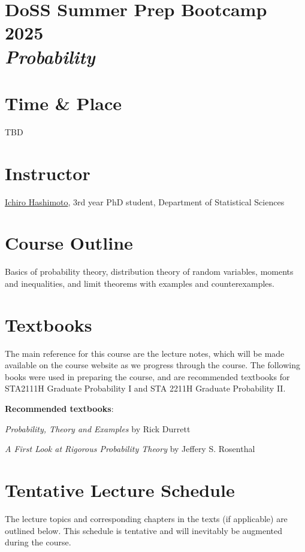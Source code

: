 \documentclass[12pt]{article}
\date{ }
\begin{document}
\section*{DoSS Summer Prep Bootcamp 2025 \\  {\it{Probability}}}

\section{Time \& Place}
TBD

\section{Instructor}
\href{your webpage}{Ichiro Hashimoto}, 3rd year PhD student, Department of Statistical Sciences



\section{Course Outline}

Basics of probability theory, distribution theory of random variables, moments and inequalities, and limit theorems with examples and counterexamples.

\section{Textbooks}

The main reference for this course are the lecture notes, which will be made available on the course website as we progress through the course. The following books were used in preparing the course, and are recommended textbooks for STA2111H Graduate Probability I and STA 2211H Graduate Probability II. 

\vspace{1.0cm}

{\bf{Recommended textbooks}}:
\vspace{0.1cm}
\noindent

{\emph{Probability, Theory and Examples}} by Rick Durrett

{\emph{A First Look at Rigorous Probability Theory}} by Jeffery S. Rosenthal

\newpage
\section{Tentative Lecture Schedule}
The lecture topics and corresponding chapters in the texts (if applicable) are outlined below.  This schedule is tentative and will inevitably be augmented during the course.  
\end{document}
